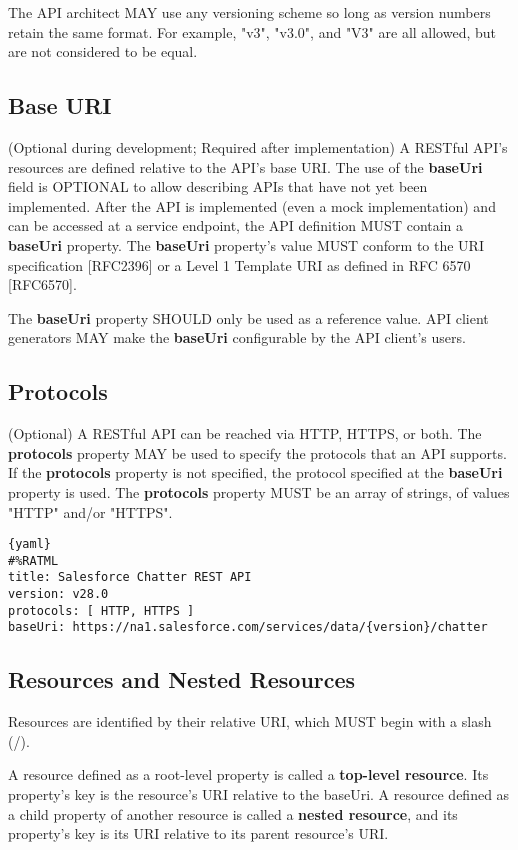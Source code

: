 The API architect MAY use any versioning scheme so long as version numbers retain the same format. For example, "v3", "v3.0", and "V3" are all allowed, but are not considered to be equal.

\subsection{Base URI}
(Optional during development; Required after implementation)
A RESTful API's resources are defined relative to the API's base URI. The use of the \textbf{baseUri} field is OPTIONAL to allow describing APIs that have not yet been implemented. After the API is implemented (even a mock implementation) and can be accessed at a service endpoint, the API definition MUST contain a \textbf{baseUri} property. The \textbf{baseUri} property's value MUST conform to the URI specification [RFC2396] or a Level 1 Template URI as defined in RFC 6570 [RFC6570].

The \textbf{baseUri} property SHOULD only be used as a reference value. API client generators MAY make the \textbf{baseUri} configurable by the API client's users.

\subsection{Protocols}
(Optional)
A RESTful API can be reached via HTTP, HTTPS, or both. The \textbf{protocols} property MAY be used to specify the protocols that an API supports. If the \textbf{protocols} property is not specified, the protocol specified at the \textbf{baseUri} property is used. The \textbf{protocols} property MUST be an array of strings, of values "HTTP" and/or "HTTPS".

\begin{lstlisting}{yaml}
#%RATML
title: Salesforce Chatter REST API
version: v28.0
protocols: [ HTTP, HTTPS ]
baseUri: https://na1.salesforce.com/services/data/{version}/chatter
\end{lstlisting}


\subsection{Resources and Nested Resources}

Resources are identified by their relative URI, which MUST begin with a slash (/).

A resource defined as a root-level property is called a \textbf{top-level resource}. Its property's key is the resource's URI relative to the baseUri. A resource defined as a child property of another resource is called a \textbf{nested resource}, and its property's key is its URI relative to its parent resource's URI.


